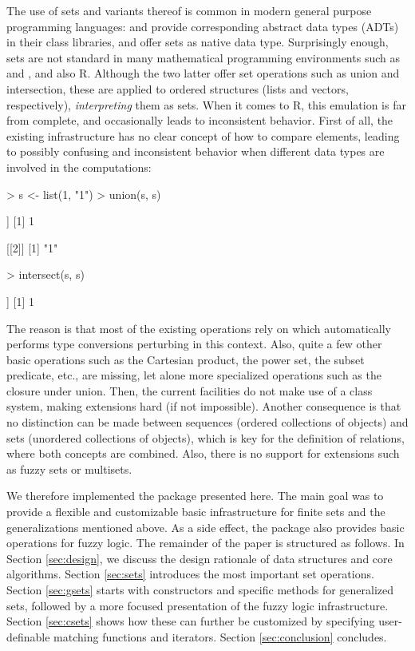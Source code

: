 \documentclass[article]{jss}
\newcommand\R{\textsf{R}}
\newcommand{\codefun}[1]{\code{#1()}}
\begin{document}
The use of sets and variants thereof is common in modern general purpose
programming languages:   and 
provide corresponding abstract data types (ADTs) in their class
libraries,  and 
offer sets as native data type.
Surprisingly enough, sets are not standard in many
mathematical programming environments such as  and
, and also \R. Although the two latter offer
set operations such as union and intersection, these are applied to
ordered structures (lists and vectors, respectively),
\emph{interpreting} them as sets. When it comes to \R,
this emulation is far from complete, and occasionally leads to inconsistent
behavior. First of all, the existing infrastructure has no clear concept
of how to compare elements, leading to possibly confusing and
inconsistent behavior when different data types are involved in the
computations:
\begin{Schunk}
\begin{Sinput}
> s <- list(1, "1")
> union(s, s)
\end{Sinput}
\begin{Soutput}
[[1]]
[1] 1

[[2]]
[1] "1"
\end{Soutput}
\begin{Sinput}
> intersect(s, s)
\end{Sinput}
\begin{Soutput}
[[1]]
[1] 1
\end{Soutput}
\end{Schunk}
The reason is that most of the existing operations rely on
\codefun{match} which automatically performs type conversions
perturbing in this context.
Also, quite a few other basic operations such as
the Cartesian product, the power set, the subset predicate, etc., are
missing, let alone more specialized operations such as
the closure under union.
Then, the current facilities do not make use of a class
system, making extensions hard (if not impossible).  Another consequence
is that no distinction can be made between sequences (ordered
collections of objects) and sets (unordered collections of objects),
which is key for the definition of relations, where both concepts are
combined.  Also, there is no support for extensions such as fuzzy sets
or multisets.

We therefore implemented the  package \citep{sets:meyer+hornik:2008}
presented here. The main goal was to provide a
flexible and customizable basic infrastructure for finite sets and the
generalizations mentioned above. As a side effect, the package
also provides basic operations for fuzzy logic. The remainder of the
paper is structured as follows. In Section \ref{sec:design}, we
discuss the design rationale of data structures and core algorithms.
Section \ref{sec:sets} introduces the most important set operations. Section
\ref{sec:gsets} starts with constructors and specific methods for
generalized sets, followed by a more focused presentation of the fuzzy
logic infrastructure. Section
\ref{sec:csets} shows how these can further be customized by specifying
user-definable matching functions and iterators. Section
\ref{sec:conclusion} concludes.
\end{document}
